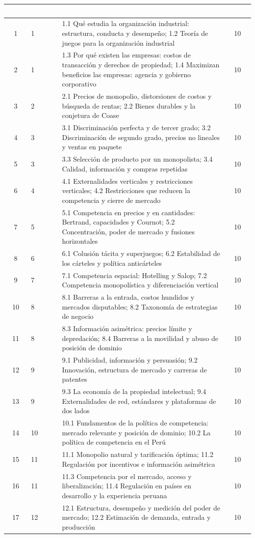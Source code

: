 \documentclass[11pt,a4paper]{article}
\renewcommand{\arraystretch}{1.3}
\newcommand{\cab}[1]{\textcolor{white}{\sffamily\bfseries #1}}
\newcommand{\filasalternas}{\rowcolors{2}{white}{tonoPalido}}
\begin{document}
{\small\filasalternas
\renewcommand{\arraystretch}{1.1}\noindent\begin{tabularx}{\textwidth}{clXc}
\toprule
\rowcolor{tonoOscuro}\cab{Sem.} & \cab{Bloque} & \cab{Temas} & \cab{Horas} \\
\midrule
1  & 1 & 1.1 Qué estudia la organización industrial: estructura, conducta y desempeño; 1.2 Teoría de juegos para la organización industrial & 10 \\
2  & 1 & 1.3 Por qué existen las empresas: costos de transacción y derechos de propiedad; 1.4 Maximizan beneficios las empresas: agencia y gobierno corporativo & 10 \\
\midrule
3  & 2 & 2.1 Precios de monopolio, distorsiones de costos y búsqueda de rentas; 2.2 Bienes durables y la conjetura de Coase & 10 \\
\midrule
4  & 3 & 3.1 Discriminación perfecta y de tercer grado; 3.2 Discriminación de segundo grado, precios no lineales y ventas en paquete & 10 \\
5  & 3 & 3.3 Selección de producto por un monopolista; 3.4 Calidad, información y compras repetidas & 10 \\
\midrule
6  & 4 & 4.1 Externalidades verticales y restricciones verticales; 4.2 Restricciones que reducen la competencia y cierre de mercado & 10 \\
\midrule
7  & 5 & 5.1 Competencia en precios y en cantidades: Bertrand, capacidades y Cournot; 5.2 Concentración, poder de mercado y fusiones horizontales & 10 \\
8  & 6 & 6.1 Colusión tácita y superjuegos; 6.2 Estabilidad de los cárteles y política anticárteles & 10 \\
9  & 7 & 7.1 Competencia espacial: Hotelling y Salop; 7.2 Competencia monopolística y diferenciación vertical & 10 \\
10 & 8 & 8.1 Barreras a la entrada, costos hundidos y mercados disputables; 8.2 Taxonomía de estrategias de negocio & 10 \\
11 & 8 & 8.3 Información asimétrica: precios límite y depredación; 8.4 Barreras a la movilidad y abuso de posición de dominio & 10 \\
12 & 9 & 9.1 Publicidad, información y persuasión; 9.2 Innovación, estructura de mercado y carreras de patentes & 10 \\
13 & 9 & 9.3 La economía de la propiedad intelectual; 9.4 Externalidades de red, estándares y plataformas de dos lados & 10 \\
\midrule
14 & 10 & 10.1 Fundamentos de la política de competencia: mercado relevante y posición de dominio; 10.2 La política de competencia en el Perú & 10 \\
15 & 11 & 11.1 Monopolio natural y tarificación óptima; 11.2 Regulación por incentivos e información asimétrica & 10 \\
16 & 11 & 11.3 Competencia por el mercado, acceso y liberalización; 11.4 Regulación en países en desarrollo y la experiencia peruana & 10 \\
17 & 12 & 12.1 Estructura, desempeño y medición del poder de mercado; 12.2 Estimación de demanda, entrada y producción & 10 \\
\bottomrule
\end{tabularx}
}
\end{document}
